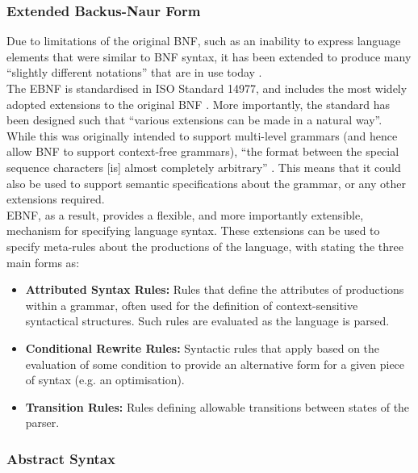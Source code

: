 
\subsubsection{Extended Backus-Naur Form} %
\label{ssub:extended_backus_naur_form}
Due to limitations of the original BNF, such as an inability to express language elements that were similar to BNF syntax, it has been extended to produce many ``slightly different notations'' that are in use today \citep{standard1996ebnf}.\\

The EBNF is standardised in ISO Standard 14977, and includes the most widely adopted extensions to the original BNF \citep{standard1996ebnf}.
More importantly, the standard has been designed such that ``various extensions can be made in a natural way''.
While this was originally intended to support multi-level grammars (and hence allow BNF to support context-free grammars), ``the format between the special sequence characters [is] almost completely arbitrary'' \citep[pg. vii]{standard1996ebnf}.
This means that it could also be used to support semantic specifications about the grammar, or any other extensions required.\\

EBNF, as a result, provides a flexible, and more importantly extensible, mechanism for specifying language syntax.
These extensions can be used to specify meta-rules about the productions of the language, with \citet{slonneger1995formal} stating the three main forms as:
\begin{itemize}
    \item \textbf{Attributed Syntax Rules:} Rules that define the attributes of productions within a grammar, often used for the definition of context-sensitive syntactical structures. 
    Such rules are evaluated as the language is parsed. 
    \item \textbf{Conditional Rewrite Rules:} Syntactic rules that apply based on the evaluation of some condition to provide an alternative form for a given piece of syntax (e.g. an optimisation). 
    \item \textbf{Transition Rules:} Rules defining allowable transitions between states of the parser. 
\end{itemize}


\subsubsection{Abstract Syntax} %
\label{ssub:abstract_syntax}

